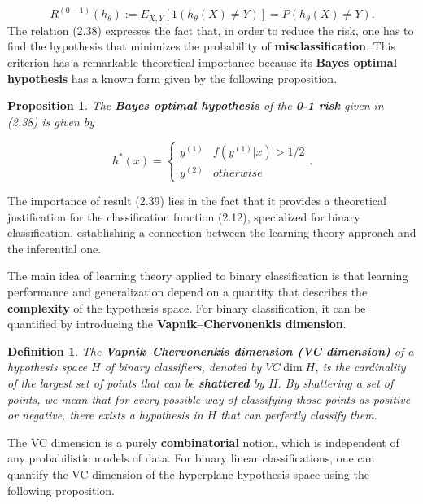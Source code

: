 \documentclass{report}
\newtheorem{definition}{Definition}[chapter]
\newtheorem{proposition}{Proposition}[chapter]
\begin{document}
\begin{equation}
R^{(0-1)}(h_\theta) := E_{X,Y}[1(h_\theta(X) \neq Y)] = P(h_\theta(X) \neq Y).
\end{equation}
The relation (2.38) expresses the fact that, in order to reduce the risk, one has to find the hypothesis that minimizes the probability of \textbf{misclassification}. This criterion has a remarkable theoretical importance because its \textbf{Bayes optimal hypothesis} has a known form given by the following proposition.

\begin{proposition}
The \textbf{Bayes optimal hypothesis} of the \textbf{0-1 risk} given in (2.38) is given by

\begin{equation}
h^*(x) = \left\{\begin{matrix}
y^{(1)} & f(y^{(1)}|x) > 1/2\\
y^{(2)} & otherwise
\end{matrix}\right..
\end{equation}
\end{proposition}
The importance of result (2.39) lies in the fact that it provides a theoretical justification for the classification function (2.12), specialized for binary classification, establishing a connection between the learning theory approach and the inferential one.

The main idea of learning theory applied to binary classification is that learning performance and generalization depend on a quantity that describes the \textbf{complexity} of the hypothesis space.
For binary classification, it can be quantified by introducing the \textbf{Vapnik–Chervonenkis dimension}.

\begin{definition}
The \textbf{Vapnik–Chervonenkis dimension (VC dimension)} of a hypothesis space $H$ of binary classifiers, denoted by $VC\dim H$, is the cardinality of the largest set of points that can be \textbf{shattered} by $H$. By shattering a set of points, we mean that for every possible way of classifying those points as positive or negative, there exists a hypothesis in $H$ that can perfectly classify them.
\end{definition}
The VC dimension is a purely \textbf{combinatorial} notion, which is independent of any probabilistic models of data. For binary linear classifications, one can quantify the VC dimension of the hyperplane hypothesis space using the following proposition.
\end{document}
